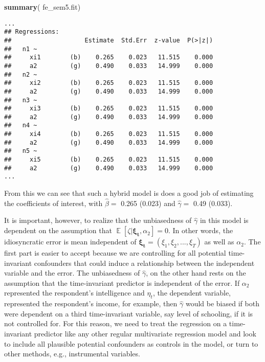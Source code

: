 \documentclass[]{interact}
\theoremstyle{plain}%
\theoremstyle{definition}
\theoremstyle{remark}
\newenvironment{Shaded}{\begin{snugshade}}{\end{snugshade}}
\newcommand{\KeywordTok}[1]{\textcolor[rgb]{0.13,0.29,0.53}{\textbf{#1}}}
\newcommand{\NormalTok}[1]{#1}
\begin{document}
\singlespacing

\begin{Shaded}
\begin{Highlighting}[]
\KeywordTok{summary}\NormalTok{( fe\_sem5.fit)}
\end{Highlighting}
\end{Shaded}

\begin{verbatim}
...
## Regressions:
##                    Estimate  Std.Err  z-value  P(>|z|)
##   n1 ~                                                
##     xi1        (b)    0.265    0.023   11.515    0.000
##     a2         (g)    0.490    0.033   14.999    0.000
##   n2 ~                                                
##     xi2        (b)    0.265    0.023   11.515    0.000
##     a2         (g)    0.490    0.033   14.999    0.000
##   n3 ~                                                
##     xi3        (b)    0.265    0.023   11.515    0.000
##     a2         (g)    0.490    0.033   14.999    0.000
##   n4 ~                                                
##     xi4        (b)    0.265    0.023   11.515    0.000
##     a2         (g)    0.490    0.033   14.999    0.000
##   n5 ~                                                
##     xi5        (b)    0.265    0.023   11.515    0.000
##     a2         (g)    0.490    0.033   14.999    0.000
...
\end{verbatim}

\doublespacing

From this we can see that such a hybrid model is does a good job of
estimating the coefficients of interest, with \(\hat{\beta} =\) 0.265
(0.023) and \(\hat{\gamma} =\) 0.49 (0.033).

It is important, however, to realize that the unbiasedness of
\(\hat{\gamma}\) in this model is dependent on the assumption that
\(\mathop{\mathrm{\mathbb{E}}}[\zeta | \bm{\xi_{t}}, \alpha_{2}] = 0\).
In other words, the idiosyncratic error is mean independent of
\(\bm{\xi_{t}} = (\xi_{1}, \xi_{2}, ..., \xi_{T})\) as well as
\(\alpha_{2}\). The first part is easier to accept because we are
controlling for all potential time-invariant confounders that could
induce a relationship between the independent variable and the error.
The unbiasedness of \(\hat{\gamma}\), on the other hand rests on the
assumption that the time-invariant predictor is independent of the
error. If \(\alpha_{2}\) represented the respondent's intelligence and
\(\eta_{t}\), the dependent variable, represented the respondent's
income, for example, then \(\hat{\gamma}\) would be biased if both were
dependent on a third time-invariant variable, say level of schooling, if
it is not controlled for. For this reason, we need to treat the
regression on a time-invariant predictor like any other regular
multivariate regression model and look to include all plausible
potential confounders as controls in the model, or turn to other
methods, e.g., instrumental variables.



\end{document}
